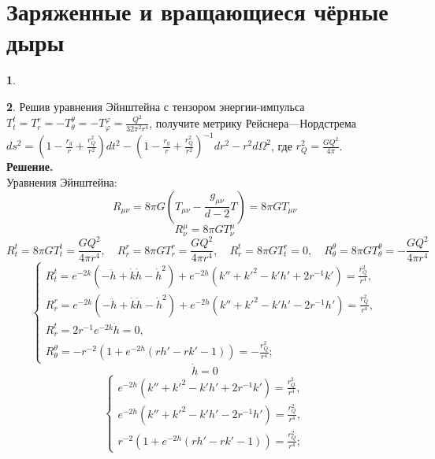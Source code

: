\documentclass[12pt]{article}
\theoremstyle{definition}
\newtheorem{zad}{}[section]
\begin{document}
\section{Заряженные и вращающиеся чёрные дыры}
\begin{zad}

\end{zad}
\begin{zad}
Решив уравнения Эйнштейна с тензором энергии-импульса $T^t_t=T^r_r=-T_\theta^\theta=-T^\varphi_\varphi=\frac{Q^2}{32\pi^2r^ 4}$, получите метрику Рейснера—Нордстрема $ds^2=\left(1-\frac{r_g}{r}+\frac{r^2_Q}{r^2}\right)dt^2-\left(1-\frac{r_g}{r}+\frac{r^2_Q}{r^2}\right)^{-1}dr^2-r^2d\Omega^2$, где $r^2_Q=\frac{GQ^2}{4\pi}$.\\
\textbf{Решение.}\\
Уравнения Эйнштейна:
\begin{equation}
    R_{\mu\nu}=8\pi G\left(T_{\mu\nu}-\frac{g_{\mu\nu}}{d-2}T\right)=8\pi GT_{\mu\nu}
\end{equation}
\begin{equation}
    R^\mu_\nu=8\pi GT^\mu_\nu
\end{equation}
\begin{equation*}
    R_t^t=8\pi GT_t^t=\frac{GQ^2}{4\pi r^4},\quad R_r^r=8\pi GT_r^r=\frac{GQ^2}{4\pi r^4},\quad R^t_r=8\pi GT_t^r=0,\quad R_\theta^\theta=8\pi GT_\theta^\theta=-\frac{GQ^2}{4\pi r^4}
\end{equation*}
\begin{equation}
\begin{cases}
    R_t^t=e^{-2k}(-\ddot{h}+\dot{k}\dot{h}-\dot{h}^2)+e^{-2h}(k''+k'^2-k'h'+2r^{-1}k')=\frac{r_Q^2}{r^4},\\
    R_r^r=e^{-2k}(-\ddot{h}+\dot{k}\dot{h}-\dot{h}^2)+e^{-2h}(k''+k'^2-k'h'-2r^{-1}h')=\frac{r_Q^2}{r^4},\\
    R^t_r=2r^{-1}e^{-2k}\dot{h}=0,\\
    R_\theta^\theta=-r^{-2}(1+e^{-2h}(rh'-rk'-1))=-\frac{r_Q^2}{r^4};
\end{cases}
\end{equation}
\begin{equation}
    \dot{h}=0
\end{equation}
\begin{equation}
\begin{cases}
    e^{-2h}(k''+k'^2-k'h'+2r^{-1}k')=\frac{r_Q^2}{r^4},\\
    e^{-2h}(k''+k'^2-k'h'-2r^{-1}h')=\frac{r_Q^2}{r^4},\\
    r^{-2}(1+e^{-2h}(rh'-rk'-1))=\frac{r_Q^2}{r^4};

\end{cases}
\end{equation}
\end{zad}
\end{document}
